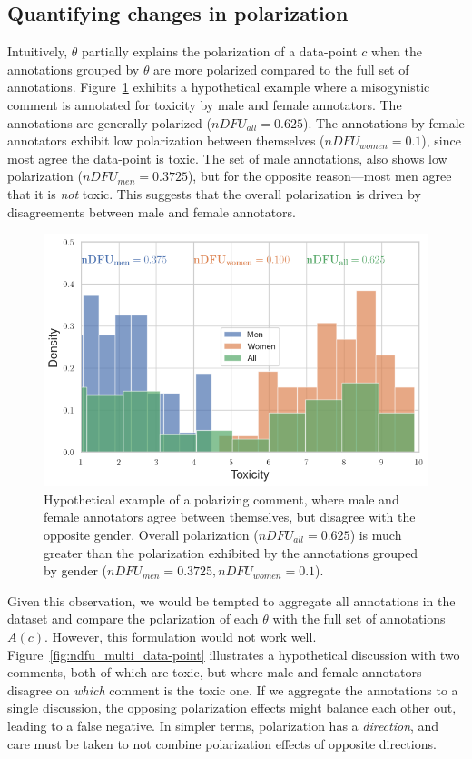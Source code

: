 \documentclass{article}
\begin{document}
\subsection{Quantifying changes in polarization}
\label{ssec:methodology:intuition}

Intuitively, $\theta$ partially explains the polarization of a data-point $c$ when the annotations grouped by $\theta$ are more polarized compared to the full set of annotations. Figure~\ref{fig:ndfu_single_data-point} exhibits a hypothetical example where a misogynistic comment is annotated for toxicity by male and female annotators. The annotations are generally polarized ($nDFU_{all} = 0.625$). The annotations by female annotators exhibit low polarization between themselves ($nDFU_{women} = 0.1$), since most agree the data-point is toxic. The set of male annotations, also shows low polarization ($nDFU_{men} = 0.3725$), but for the opposite reason---most men agree that it is \emph{not} toxic. This suggests that the overall polarization is driven by disagreements between male and female annotators.

\begin{figure}
	\centering
	\includegraphics[width=0.8\linewidth]{ndfu_combined.png}
	\caption{Hypothetical example of a polarizing comment, where male and female annotators agree between themselves, but disagree with the opposite gender. Overall polarization ($nDFU_{all} = 0.625$) is much greater than the polarization exhibited by the annotations grouped by gender ($nDFU_{men} = 0.3725, nDFU_{women} = 0.1$). %
    }
	\label{fig:ndfu_single_data-point}
\end{figure}

Given this observation, we would be tempted to aggregate all annotations in the dataset and compare the polarization of each $\theta$ with the full set of annotations $A(c)$. However, this formulation would not work well. Figure~\ref{fig:ndfu_multi_data-point} illustrates a hypothetical discussion with two comments, both of which are toxic, but where male and female annotators disagree on \emph{which} comment is the toxic one. If we aggregate the annotations to a single discussion, the opposing polarization effects might balance each other out, leading to a false negative. In simpler terms, polarization has a \textit{direction}, and care must be taken to not combine polarization effects of opposite directions.
\end{document}
